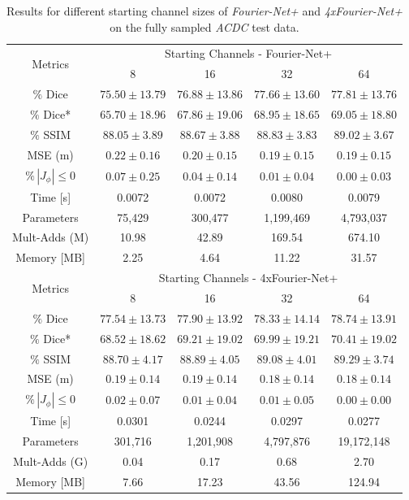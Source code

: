 \documentclass[english,version-2022-01]{uzl-thesis} %
\begin{document}
\begin{table}[h] %
	\centering
	\caption{Results for different starting channel sizes of \emph{Fourier-Net+} and \emph{4xFourier-Net+} on the fully sampled \emph{ACDC} test data.}
	\label{tab:StartingChannelsFourierNet+ACDC}
	\begin{tabular}{c c c c c} %
		\toprule
		\multirow{2}{*}{Metrics} & \multicolumn{4}{c}{Starting Channels - Fourier-Net+} \\
		\cline{2-5}
		 & 8 & 16 & 32 & 64 \\		
		\midrule
		$\%$ Dice & $75.50 \pm 13.79$ & $76.88 \pm 13.86$ & $77.66 \pm 13.60$ & $77.81 \pm 13.76$ \\
		$\%$ Dice* & $65.70 \pm 18.96$ & $67.86 \pm 19.06$ & $68.95 \pm 18.65$ & $69.05 \pm 18.80$ \\
		$\%$ SSIM & $88.05 \pm 3.89$ & $88.67 \pm 3.88$ & $88.83 \pm 3.83$ & $89.02 \pm 3.67$ \\
		MSE (m) & $0.22 \pm 0.16$ & $0.20 \pm 0.15$ & $0.19 \pm 0.15$ & $0.19 \pm 0.15$ \\
		$\% \, |J_{\phi}|\leq0$ & $0.07 \pm 0.25$ & $0.04 \pm 0.14$ & $0.01 \pm 0.04$ & $0.00 \pm 0.03$ \\
		Time [s] 	  & 0.0072 & 0.0072 & 0.0080 & 0.0079 \\
		Parameters 	  & 75,429 	& 300,477 	& 1,199,469 	& 4,793,037 \\
		Mult-Adds (M) & 10.98 	& 42.89 		& 169.54 	& 674.10 \\
		Memory [MB] 	  & 2.25 	& 4.64 		& 11.22 		& 31.57 \\
		\midrule		
		\multirow{2}{*}{Metrics} & \multicolumn{4}{c}{Starting Channels - 4xFourier-Net+} \\
		\cline{2-5} 
		 & 8 & 16 & 32 & 64 \\		
		\midrule
		$\%$ Dice & $77.54 \pm 13.73$ & $77.90 \pm 13.92$ & $78.33 \pm 14.14$ & $78.74 \pm 13.91$ \\
		$\%$ Dice* & $68.52 \pm 18.62$ & $69.21 \pm 19.02$ & $69.99 \pm 19.21$ & $70.41 \pm 19.02$ \\
		$\%$ SSIM & $88.70 \pm 4.17$ & $88.89 \pm 4.05$ & $89.08 \pm 4.01$ & $89.29 \pm 3.74$ \\
		MSE (m) & $0.19 \pm 0.14$ & $0.19 \pm 0.14$ & $0.18 \pm 0.14$ & $0.18 \pm 0.14$ \\
		$\% \, |J_{\phi}|\leq0$ & $0.02 \pm 0.07$ & $0.01 \pm 0.04$ & $0.01 \pm 0.05$ & $0.00 \pm 0.00$ \\
		Time [s] 	  & 0.0301 	& 0.0244 	& 0.0297 	& 0.0277 \\
		Parameters 	  & 301,716 	& 1,201,908 	& 4,797,876 	& 19,172,148 \\
		Mult-Adds (G) & 0.04 	& 0.17 		& 0.68 		& 2.70 \\
		Memory [MB] 	  & 7.66 	& 17.23 		& 43.56 		& 124.94 \\
		\bottomrule
	\end{tabular}	
\end{table}
\end{document}
